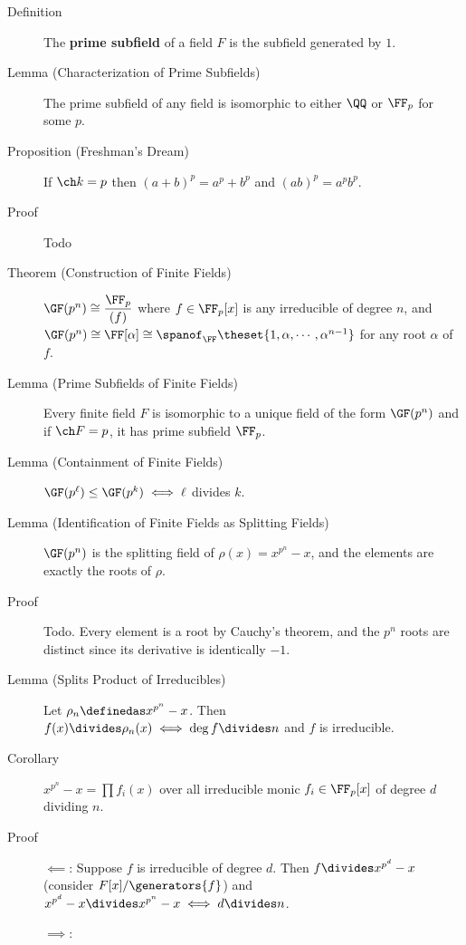 \begin{description}
\item[Definition]
The \textbf{prime subfield} of a field \(F\) is the subfield generated
by \(1\).
\item[Lemma (Characterization of Prime Subfields)]
The prime subfield of any field is isomorphic to either \(\QQ\) or
\(\FF_p\) for some \(p\).
\item[Proposition (Freshman's Dream)]
If \(\ch k = p\) then \((a+b)^p = a^p + b^p\) and \((ab)^p = a^p b^p\).
\item[Proof]
Todo
\item[Theorem (Construction of Finite Fields)]
\(\GF(p^n)\cong \displaystyle\frac{\FF_p}{(f)}\) where
\(f \in \FF_p[x]\) is any irreducible of degree \(n\), and
\(\GF(p^n) \cong \FF[\alpha] \cong \spanof_\FF\theset{1, \alpha, \cdots, \alpha^{n-1}}\)
for any root \(\alpha\) of \(f\).
\item[Lemma (Prime Subfields of Finite Fields)]
Every finite field \(F\) is isomorphic to a unique field of the form
\(\GF(p^n)\) and if \(\ch F = p\), it has prime subfield \(\FF_p\).
\item[Lemma (Containment of Finite Fields)]
\(\GF(p^\ell) \leq \GF(p^k) \iff \ell\) divides \(k\).
\item[Lemma (Identification of Finite Fields as Splitting Fields)]
\(\GF(p^n)\) is the splitting field of \(\rho(x) = x^{p^n} - x\), and
the elements are exactly the roots of \(\rho\).
\item[Proof]
Todo. Every element is a root by Cauchy's theorem, and the \(p^n\) roots
are distinct since its derivative is identically \(-1\).
\item[Lemma (Splits Product of Irreducibles)]
Let \(\rho_n \definedas x^{p^n} - x\). Then
\(f(x) \divides \rho_n(x) \iff \deg f \divides n\) and \(f\) is
irreducible.
\item[Corollary]
\(x^{p^n} - x = \prod f_i(x)\) over all irreducible monic
\(f_i \in \FF_p[x]\) of degree \(d\) dividing \(n\).
\item[Proof]
\hfill

\(\impliedby\): Suppose \(f\) is irreducible of degree \(d\). Then
\(f \divides x^{p^d} - x\) (consider \(F[x]/\generators{f}\)) and
\(x^{p^d} - x \divides x^{p^n} - x \iff d\divides n\).

\(\implies\):


\end{description}

